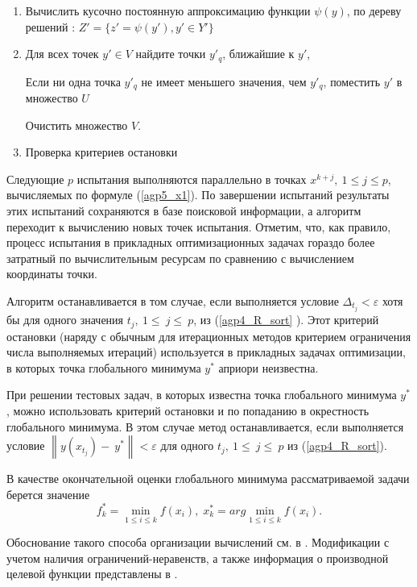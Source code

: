 \documentclass[runningheads]{llncs}
\begin{document}
\begin{enumerate}
	\item Вычислить кусочно постоянную аппроксимацию функции $\psi(y)$, по дереву решений : $Z' = \{ z'=  \psi(y'), y' \in Y'\}$
	
	\item Для всех точек $y'\in V$ найдите точки $y'_q$, ближайшие к $y'$,
	
	Если ни одна точка $y'_q$ не имеет меньшего значения, чем $y'_q$, поместить $y'$ в множество $U$
	
	Очистить множество $V$.
	
	\item Проверка критериев остановки
	
	
\end{enumerate}

Следующие $p$ испытания выполняются параллельно в точках $x^{k+j},\ 1\leq j\leq p$, вычисляемых по формуле (\ref{agp5_x1}). По завершении испытаний результаты этих испытаний сохраняются в базе поисковой информации, а алгоритм переходит к вычислению новых точек испытания.
Отметим, что, как правило, процесс испытания в прикладных оптимизационных задачах гораздо более затратный по вычислительным ресурсам по сравнению с вычислением координаты точки.

Алгоритм останавливается в том случае, если выполняется условие \(\Delta_{t_j} < \varepsilon\) хотя бы для одного значения $t_j,\ 1\le\ j\le\ p$, из (\ref{agp4_R_sort} ). Этот критерий остановки (наряду с обычным для итерационных методов критерием ограничения числа выполняемых итераций) используется в прикладных задачах оптимизации, в которых точка глобального минимума $y^*$ априори неизвестна.

При решении тестовых задач, в которых известна точка глобального минимума $y^*$, можно использовать критерий остановки и по попаданию в окрестность глобального минимума. В этом случае метод останавливается, если выполняется условие $\left\|y(x_{t_j})-\ y^\ast\right\| < \varepsilon$ для одного $t_j,\ 1\le\ j\le\ p$ из (\ref{agp4_R_sort}).

В качестве окончательной оценки глобального минимума рассматриваемой задачи берется значение 
\begin{equation} 
	f_k^*=\min_{1\leq i \leq k}f(x_i), \; x_k^*=arg \min_{1\leq i \leq k}f(x_i). 
\end{equation} 


Обоснование такого способа организации вычислений см. в \cite{Strongin2000,Barkalov2016}. Модификации с учетом наличия ограничений-неравенств, а также информация о производной целевой функции представлены в \cite{Barkalov2002,Gergel1997}.
\end{document}

